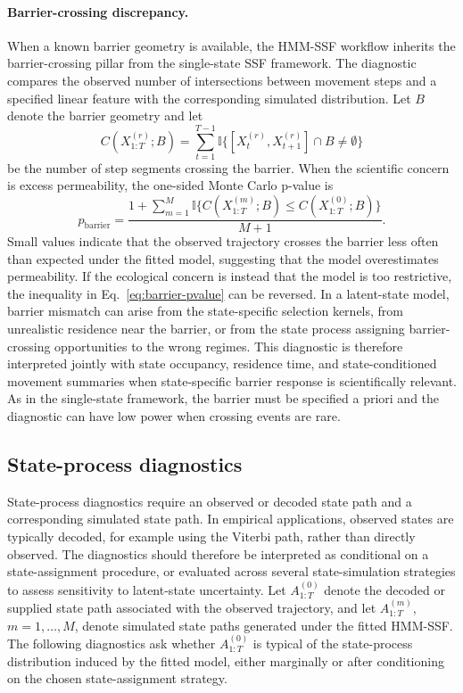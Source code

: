 \documentclass[11pt]{article}
\newcommand{\ind}{\mathbb{I}}
\begin{document}
\paragraph{Barrier-crossing discrepancy.}
When a known barrier geometry is available, the HMM-SSF workflow inherits the
barrier-crossing pillar from the single-state SSF framework. The diagnostic
compares the observed number of intersections between movement steps and a
specified linear feature with the corresponding simulated distribution. Let
$B$ denote the barrier geometry and let
\begin{equation*}
  C(X_{1:T}^{(r)};B)
  =
  \sum_{t=1}^{T-1}
  \ind\{[X_t^{(r)},X_{t+1}^{(r)}]\cap B \ne \emptyset\}
\end{equation*}
be the number of step segments crossing the barrier. When the scientific
concern is excess permeability, the one-sided Monte Carlo p-value is
\begin{equation}
  p_{\mathrm{barrier}}
  =
  \frac{
    1+
    \sum_{m=1}^{M}
    \ind\{
      C(X_{1:T}^{(m)};B)
      \le
      C(X_{1:T}^{(0)};B)
    \}
  }{M+1}.
  \label{eq:barrier-pvalue}
\end{equation}
Small values indicate that the observed trajectory crosses the barrier less
often than expected under the fitted model, suggesting that the model
overestimates permeability. If the ecological concern is instead that the
model is too restrictive, the inequality in Eq.~\eqref{eq:barrier-pvalue} can
be reversed. In a latent-state model, barrier mismatch can arise from the
state-specific selection kernels, from unrealistic residence near the barrier,
or from the state process assigning barrier-crossing opportunities to the wrong
regimes. This diagnostic is therefore interpreted jointly with state
occupancy, residence time, and state-conditioned movement summaries when
state-specific barrier response is scientifically relevant. As in the
single-state framework, the barrier must be specified a priori and the
diagnostic can have low power when crossing events are rare.

\subsection{State-process diagnostics}

State-process diagnostics require an observed or decoded state path and a
corresponding simulated state path. In empirical applications, observed states
are typically decoded, for example using the Viterbi path, rather than directly
observed. The diagnostics should therefore be interpreted as conditional on a
state-assignment procedure, or evaluated across several state-simulation
strategies to assess sensitivity to latent-state uncertainty. Let
$A_{1:T}^{(0)}$ denote the decoded or supplied state path associated with the
observed trajectory, and let $A_{1:T}^{(m)}$, $m=1,\ldots,M$, denote simulated
state paths generated under the fitted HMM-SSF. The following diagnostics ask
whether $A_{1:T}^{(0)}$ is typical of the state-process distribution induced by
the fitted model, either marginally or after conditioning on the chosen
state-assignment strategy.
\end{document}
